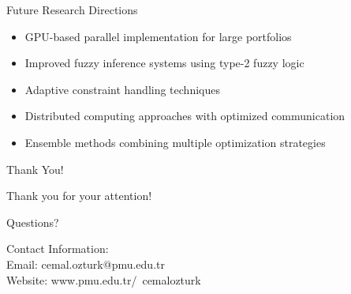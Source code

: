 \documentclass[aspectratio=169,xcolor=table]{beamer}
\begin{document}
\begin{frame}{Future Research Directions}
  \begin{tcolorbox}[
    enhanced,
    colback=yellow!5,
    colframe=yellow!70,
    arc=2mm,
    title=Technical Enhancements,
    fonttitle=\bfseries\large,
    boxrule=0.5mm
  ]
    \begin{itemize}
      \item GPU-based parallel implementation for large portfolios
      \item Improved fuzzy inference systems using type-2 fuzzy logic
      \item Adaptive constraint handling techniques
      \item Distributed computing approaches with optimized communication
      \item Ensemble methods combining multiple optimization strategies
    \end{itemize}
  \end{tcolorbox}
\end{frame}

\begin{frame}{Thank You!}
  \begin{center}
    \Large{Thank you for your attention!}
    
    \vspace{1cm}
    
    \large{Questions?}
    
    \vspace{1cm}
    
    \normalsize{Contact Information:}\\
    Email: cemal.ozturk@pmu.edu.tr\\
    Website: www.pmu.edu.tr/~cemalozturk
  \end{center}
\end{frame}
\end{document}
